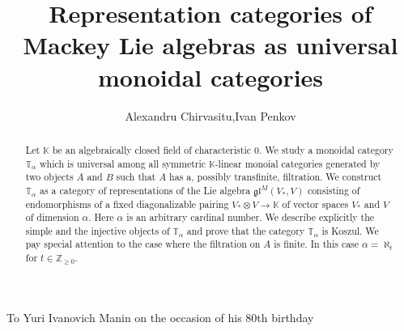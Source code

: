 \documentclass[11pt]{article}
\title{Representation categories of Mackey Lie algebras as universal monoidal categories}
\author{Alexandru Chirvasitu,\quad   Ivan Penkov}
\theoremstyle{plain}
\theoremstyle{nonumberplain}
\theoremstyle{plain}
\theoremstyle{nonumberplain}
\newcommand\bK{\mathbb K}
\newcommand\bT{\mathbb T}
\newcommand\bZ{\mathbb Z}
\newcommand\fgl{\mathfrak{gl}}
\begin{document}

\date{}


\newcommand{\Addresses}{{%
  \bigskip
  \footnotesize

  \textsc{Department of Mathematics, University at Buffalo, Buffalo,
    NY 14260-2900, USA}\par\nopagebreak \textit{E-mail address}:
  \texttt{achirvas@buffalo.edu}

  \medskip

  \textsc{Jacobs University Bremen, Campus Ring 1, 28759 Bremen, Germany}\par\nopagebreak
  \textit{E-mail address}: \texttt{i.penkov@jacobs-university.de}
}}



\maketitle


\begin{flushright}
To Yuri Ivanovich Manin on the occasion of his 80th birthday
\end{flushright}

\begin{abstract}
	Let $\bK$ be an algebraically closed field of characteristic $0$.  We study a monoidal category $\bT_\alpha$ which is universal among all symmetric $\bK$-linear monoial categories generated by two objects $A$ and $B$ such that $A$ has a, possibly transfinite, filtration.  We construct $\bT_\alpha$ as a category of representations of the Lie algebra $\fgl^M(V_*,V)$ consisting of endomorphisms of a fixed diagonalizable pairing $V_*\otimes V\to \bK$ of vector spaces $V_*$ and $V$ of dimension $\alpha$.  Here $\alpha$ is an arbitrary cardinal number.  We describe explicitly the simple and the injective objects of $\bT_\alpha$ and prove that the category $\bT_\alpha$ is Koszul.  We pay special attention to the case where the filtration on $A$ is finite.  In this case $\alpha=\aleph_t$ for $t\in\bZ_{\geq 0}$.
\end{abstract}


\vspace{.5cm}


\end{document}
